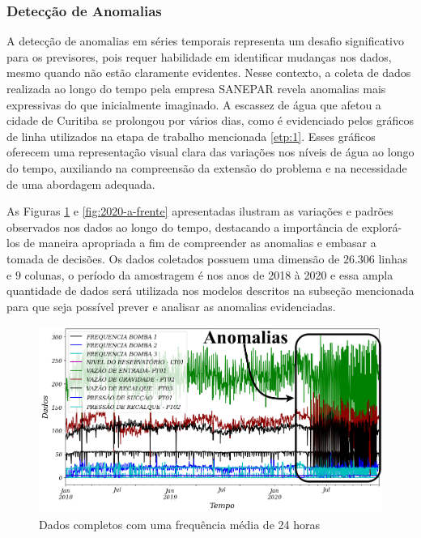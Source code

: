 \subsubsection{Detec\c c\~ao de Anomalias} \label{subsec:detec}



A detecção de anomalias em séries temporais representa um desafio significativo para os previsores, pois requer habilidade em identificar mudanças nos dados, mesmo quando não estão claramente evidentes. Nesse contexto, a coleta de dados realizada ao longo do tempo pela empresa SANEPAR revela anomalias mais expressivas do que inicialmente imaginado. A escassez de água que afetou a cidade de Curitiba se prolongou por vários dias, como é evidenciado pelos gráficos de linha utilizados na etapa de trabalho mencionada \eqref{etp:1}. Esses gráficos oferecem uma representação visual clara das variações nos níveis de água ao longo do tempo, auxiliando na compreensão da extensão do problema e na necessidade de uma abordagem adequada.

As Figuras \ref{fig:dados-todos} e \ref{fig:2020-a-frente} apresentadas ilustram as variações e padrões observados nos dados ao longo do tempo, destacando a importância de explorá-los de maneira apropriada a fim de compreender as anomalias e embasar a tomada de decisões. Os dados coletados possuem uma dimensão de $26.306$ linhas e $9$ colunas, o período da amostragem é nos anos de 2018 à 2020 e essa ampla quantidade de dados será utilizada nos modelos descritos na subseção mencionada para que seja possível prever e analisar as anomalias evidenciadas.

\begin{figure}[H]
	\centering
	\caption{Dados completos com uma frequência média de 24 horas}
	\label{fig:dados-todos}
	\includegraphics[width=0.9\linewidth]{"Introducao/Figuras/dados todos"}
	
	
\end{figure}

